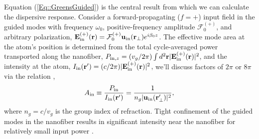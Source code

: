 \documentclass[preprint,aps,pra,onecolumn]{revtex4-1} %
\newcommand{\inp}{{\rm in}}
\newcommand{\Eamp}{\mathcal{F}_0^{(+)}}
\newcommand{\comment}[1]{{\color{Maroon} #1}}
\begin{document}
Equation (\ref{Eq::GreensGuided}) is the central result from which we can calculate the dispersive response.  Consider a forward-propagating ($f=+$) input field in the guided modes with frequency $\omega_0$, positive-frequency amplitude $\Eamp$, and arbitrary polarization, $\mathbf{E}^{(+)}_{\inp}(\br) = \Eamp  \mathbf{u}_{\rm in}(\br_\perp) e^{i \beta_0 z}$.   
The effective mode area at the atom's position is determined from the total cycle-averaged power transported along the nanofiber, $P_{{\rm in},z} = (v_g/2\pi) \int d^2\br |\mathbf{E}^{(+)}_{\inp}(\br) |^2$, and the intensity at the atom, $I_{\rm in}(\mathbf{r}') = (c/2\pi) |\mathbf{E}^{(+)}_{\inp}(\br) |^2$,\comment{we'll discuss factors of $2\pi$ or $ 8\pi $} via the relation \cite{domokos_quantum_2002},
 	\begin{align} \label{Eq::AreaIn}
 		A_{\rm in} \equiv \frac{P_{{\rm in}}}{I_{\rm in}(\mathbf{r}')} = \frac{1}{n_g |\mathbf{u}_{\rm in}(\mathbf{r}'_\perp)|^{2}},
	\end{align}
where $n_g = c/v_g$ is the group index of refraction.  Tight confinement of the guided modes in the nanofiber results in significant intensity near the nanofiber for relatively small input power \cite{bures_power_1999}.  
\end{document}
